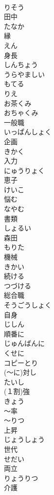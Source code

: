 \documentclass[8pt]{extreport}
\begin{document}
\begin{CJK}{UTF8}{min}
\\	りそう
\\	田中	
\\	たなか
\\	縁	
\\	えん
\\	身長	
\\	しんちょう
\\	うらやましい	
\\	もてる	
\\	りえ	
\\	お茶くみ	
\\	おちゃくみ
\\	一般職	
\\	いっぱんしょく
\\	企画	
\\	きかく
\\	入力	
\\	にゅうりょく
\\	恵子	
\\	けいこ
\\	悩む	
\\	なやむ
\\	書類	
\\	しょるい
\\	森田	
\\	もりた
\\	機械	
\\	きかい
\\	続ける	
\\	つづける
\\	総合職	
\\	そうごうしょく
\\	自身	
\\	じしん
\\	順番に	
\\	じゅんばんに
\\	くせに	
\\	コピーとり	
\\	(～に)対し	
\\	たいし
\\	(１割)強	
\\	きょう
\\	～率	
\\	～りつ
\\	上昇	
\\	じょうしょう
\\	世代	
\\	せだい
\\	両立	
\\	りょうりつ
\\	介護	

\end{CJK}
\end{document}
